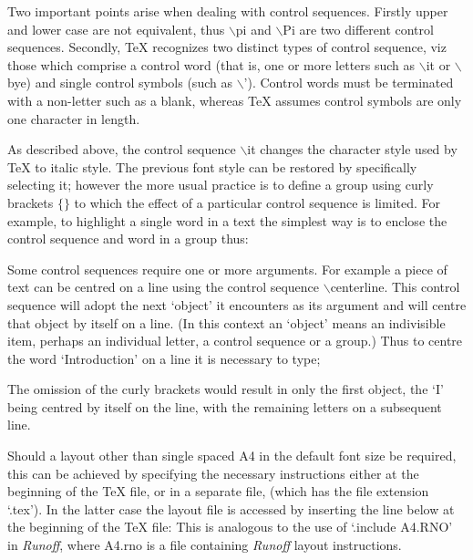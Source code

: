 Two important points arise when dealing with control sequences.
Firstly upper and lower case are not equivalent, thus $\backslash$pi and
$\backslash$Pi are two different control sequences.
Secondly, {\TeX} recognizes two distinct types of control sequence, viz 
those which comprise a control word (that is, one or more letters
such as $\backslash$it or $\backslash$bye) and single control symbols 
(such as $\backslash$').
Control words must be terminated with a non-letter such as a blank,
whereas {\TeX} assumes control symbols are only one character in length.



As described above, the control sequence $\backslash$it changes the 
character style used by {\TeX} to italic style. 
The previous font style can be restored by specifically selecting it;
however the more usual practice is to define a group using curly brackets
$\{$$\}$ to which the effect of a particular control sequence is limited.
For example, to highlight a single word in a text the simplest
way is to enclose the control sequence and word in a group thus:
\medskip
{}

Some control sequences require one or more arguments. For example a 
piece of text can be centred on a line using the control sequence 
$\backslash$centerline. 
This control sequence will adopt the next `object' it encounters as 
its argument and will centre that object  by itself on a line. 
(In this context an `object' means an indivisible item, perhaps an individual 
letter, a control sequence or a group.)
Thus to centre the word `Introduction' on a line it is necessary to
type;
\medskip
{}

The omission of the curly brackets would result in only the first object,
the `I' being centred by itself on the line, with the remaining letters on
a subsequent line.



Should a layout other than single spaced A4 in the default
font size be required,
this can be achieved by specifying the necessary instructions either
at the beginning of the {\TeX} file, or in a separate file, (which has the
file extension `.tex').
In the latter case the layout file is accessed by inserting the line below
at the beginning of the {\TeX} file:
\medskip
{}
This is analogous to the use of `.include A4.RNO' in {\it Runoff}, where
A4.rno is a file containing {\it Runoff} layout instructions.

